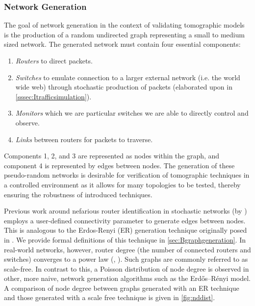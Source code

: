 \subsubsection*{Network Generation}
\label{sssec:Inetworkgeneration}

The goal of network generation in the context of validating tomographic models is the production of a random undirected graph representing a small to medium sized network. The generated network must contain four essential components: 
\begin{enumerate}
    \item \textit{Routers} to direct packets.
    \item \textit{Switches} to emulate connection to a larger external network (i.e. the world wide web) through stochastic production of packets (elaborated upon in \cref{sssec:Itrafficsimulation}).
    \item \textit{Monitors} which we are particular switches we are able to directly control and observe.
    \item \textit{Links} between routers for packets to traverse.
\end{enumerate}
Components 1, 2, and 3 are represented as nodes within the graph, and component 4 is represented by edges between nodes. The generation of these pseudo-random networks is desirable for verification of tomographic techniques in a controlled environment as it allows for many topologies to be tested, thereby ensuring the robustness of introduced techniques.\par
Previous work around nefarious router identification in stochastic networks (by \cite{barnes_stochastic_2020}) employs a user-defined connectivity parameter to generate edges between nodes. This is analogous to the Erdos-Renyi (ER) generation technique originally posed in \cite{erdos_random_1959}. We provide formal definitions of this technique in \cref{sec:Bgraphgeneration}. In real-world networks, however, router degree (the number of connected routers and switches) converges to a power law (\cite{chen_origin_2002}, \cite{zhao_measurement_2020}). Such graphs are commonly referred to as scale-free. In contrast to this, a Poisson distribution of node degree is observed in other, more naive, network generation algorithms such as the Erdős–Rényi model. A comparison of node degree between graphs generated with an ER technique and those generated with a scale free technique is given in \ref{fig:nddist}.\par
